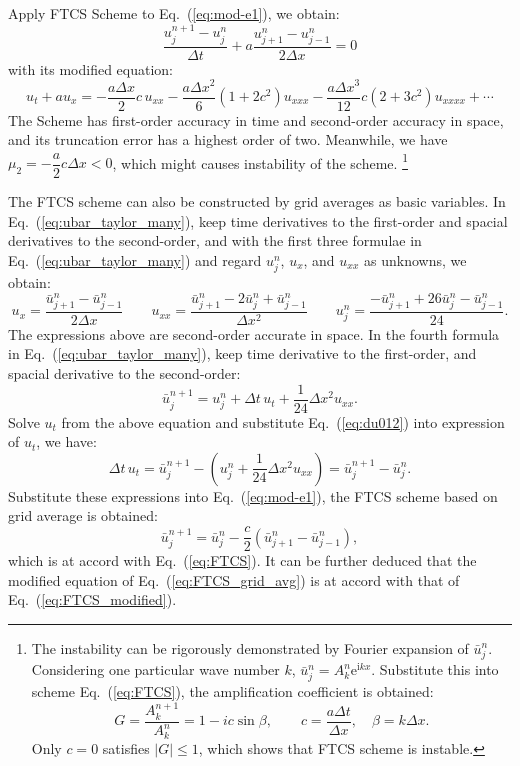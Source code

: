 \documentclass[]{article}
\newcommand{\me}{\mathrm{e}}
\newcommand{\mi}{\mathrm{i}}
\begin{document}
Apply FTCS Scheme to Eq.~(\ref{eq:mod-e1}), we obtain:
\begin{equation}
    \dfrac{u_j^{n+1}-u_j^n}{\Delta t}+a\dfrac{u_{j+1}^n-u_{j-1}^n}{2\Delta x}=0
    \label{eq:FTCS}
\end{equation}
with its modified equation:
\begin{equation}
    u_t+au_x=-\dfrac{a\Delta x}{2}c\, u_{xx}-\dfrac{a\Delta x^2}{6}(1+2c^2)u_{xxx} -\dfrac{a\Delta x^3}{12}c(2+3c^2)u_{xxxx}+\cdots
    \label{eq:FTCS_modified}
\end{equation}
The Scheme has first-order accuracy in time and second-order accuracy
in space, and its truncation error has a highest order of
two. Meanwhile, we have $\mu_2 = -\dfrac{a}{2}c\Delta x<0$, which
might causes instability of the scheme.
\footnote{The instability can be rigorously
    demonstrated by Fourier expansion of $\bar u_j^n$. Considering
    one particular wave number $k$, $\bar u_j^n=A_k^n\me^{\mi kx}$. 
    Substitute this into scheme Eq.~(\ref{eq:FTCS}), the amplification
    coefficient is obtained:
    \begin{equation*}
	G=\frac{A_k^{n+1}}{A_k^n}=1-ic\sin \beta,
	\qquad
	c=\frac{a\Delta t}{\Delta x},\quad \beta=k\Delta x.
    \end{equation*}
Only $c=0$ satisfies $|G|\leq 1$, which shows that FTCS scheme is instable.}

The FTCS scheme can also be constructed by grid averages as basic
variables. In Eq.~(\ref{eq:ubar_taylor_many}), keep time derivatives
to the first-order and spacial derivatives to the second-order, and
with the first three formulae in Eq.~(\ref{eq:ubar_taylor_many}) and
regard $u_j^n$, $u_x$, and $u_{xx}$ as unknowns, we obtain:
\begin{equation}
    u_x = \frac{\bar u_{j+1}^n-\bar u_{j-1}^n}{2\Delta x} \qquad
    u_{xx} = \frac{\bar u_{j+1}^n-2\bar u_j^n+\bar u_{j-1}^n}{\Delta x^2} \qquad
    u_j^n = \frac{-\bar u_{j+1}^n + 26\bar u_j^n - \bar u_{j-1}^n}{24}.
    \label{eq:du012}
\end{equation}
The expressions above are second-order accurate in space. In the
fourth formula in Eq.~(\ref{eq:ubar_taylor_many}), keep time
derivative to the first-order, and spacial derivative to the 
second-order:
\[
    \bar u_{j}^{n+1} = u_j^n+\Delta t\, u_t + \frac{1}{24} \Delta x^2 u_{xx}.
\]
Solve $u_t$ from the above equation and substitute
Eq.~(\ref{eq:du012}) into expression of $u_t$, we have:
\[
    \Delta t\, u_t =  \bar u_j^{n+1}-\left(u_j^n +\frac{1}{24} \Delta x^2
    u_{xx}\right) = \bar u_j^{n+1}- \bar u_{j}^n.
\]
Substitute these expressions into Eq.~(\ref{eq:mod-e1}), the FTCS
scheme based on grid average is obtained:
\begin{equation}
    \bar u_j^{n+1} = \bar u_j^n - \frac{c}{2} \left(\bar u_{j+1}^n-\bar u_{j-1}^n\right),
    \label{eq:FTCS_grid_avg}
\end{equation}
which is at accord with Eq.~(\ref{eq:FTCS}). It can be further deduced
that the modified equation of Eq.~(\ref{eq:FTCS_grid_avg}) is at
accord with that of Eq.~(\ref{eq:FTCS_modified}).
\end{document}
